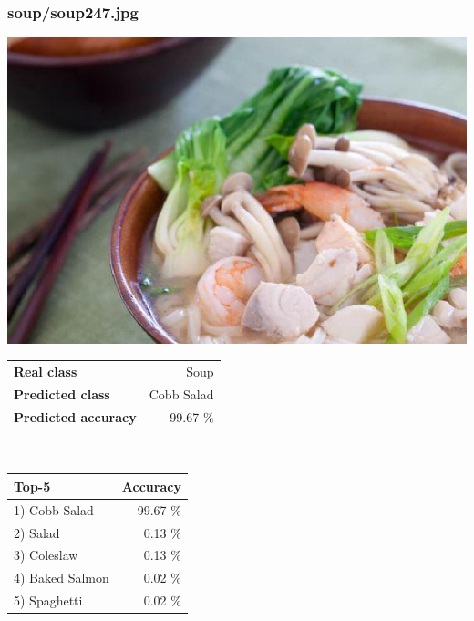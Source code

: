 \subsubsection{soup/soup247.jpg}

\begin{minipage}[t]{0.4\textwidth}
	\vspace{0pt}
	\includegraphics[width=\linewidth]{images/evaluation-images/soup/soup247.jpg}
\end{minipage}
\hfill
\begin{minipage}[t]{0.5\textwidth}
	\vspace{0pt}\raggedright
	\begin{tabularx}{\textwidth}{X r}
		\small \textbf{Real class} & \small Soup\\
		\small \textbf{Predicted class} & \small Cobb Salad\\
		\small \textbf{Predicted accuracy} & \small 99.67 \%
    \end{tabularx}\\
    
    \vspace{6pt}
	\begin{tabularx}{\textwidth}{X r}
        \small \textbf{Top-5} & \small \textbf{Accuracy} \\
        \hline
		\small 1) Cobb Salad & \small 99.67 \%\\\small 2) Salad & \small 0.13 \%\\\small 3) Coleslaw & \small 0.13 \%\\\small 4) Baked Salmon & \small 0.02 \%\\\small 5) Spaghetti & \small 0.02 \%
    \end{tabularx}
\end{minipage}
    
